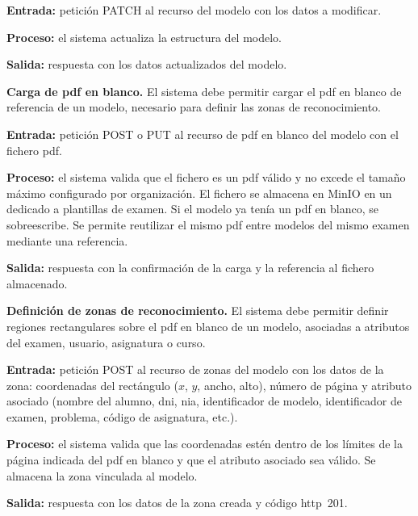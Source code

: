 \begin{functional}
    \textbf{Entrada:} petición PATCH al recurso del modelo con los datos a modificar.

    \textbf{Proceso:} el sistema actualiza la estructura del modelo.

    \textbf{Salida:} respuesta con los datos actualizados del modelo.

    \item \textbf{Carga de \acs{pdf} en blanco.} \label{rf:exams:blank_pdf}
    El sistema debe permitir cargar el \acs{pdf} en blanco de referencia de un modelo,
    necesario para definir las zonas de reconocimiento.

    \textbf{Entrada:} petición POST o PUT al recurso de \acs{pdf} en blanco del modelo con
    el fichero \acs{pdf}.

    \textbf{Proceso:} el sistema valida que el fichero es un \acs{pdf} válido y no excede el
    tamaño máximo configurado por organización. El fichero se almacena en MinIO en un
     dedicado a plantillas de examen. Si el modelo ya tenía un \acs{pdf} en
    blanco, se sobreescribe. Se permite reutilizar el mismo \acs{pdf} entre modelos del
    mismo examen mediante una referencia.

    \textbf{Salida:} respuesta con la confirmación de la carga y la referencia al fichero
    almacenado.

    \item \textbf{Definición de zonas de reconocimiento.} \label{rf:exams:zones}
    El sistema debe permitir definir regiones rectangulares sobre el \acs{pdf} en blanco de
    un modelo, asociadas a atributos del examen, usuario, asignatura o curso.

    \textbf{Entrada:} petición POST al recurso de zonas del modelo con los datos de la
    zona: coordenadas del rectángulo ($x$, $y$, ancho, alto), número de página y atributo
    asociado (nombre del alumno, \acs{dni}, \acs{nia}, identificador de modelo,
    identificador de examen, problema, código de asignatura, etc.).

    \textbf{Proceso:} el sistema valida que las coordenadas estén dentro de los límites de la
    página indicada del \acs{pdf} en blanco y que el atributo asociado sea válido. Se
    almacena la zona vinculada al modelo.

    \textbf{Salida:} respuesta con los datos de la zona creada y código \acs{http}~201.


\end{functional}
